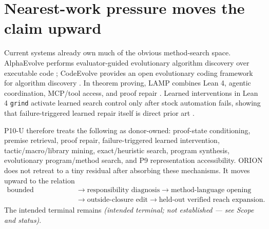 \section{Nearest-work pressure moves the claim upward}
Current systems already own much of the obvious method-search space. AlphaEvolve performs evaluator-guided evolutionary algorithm discovery over executable code \cite{alphaevolve2025}; CodeEvolve provides an open evolutionary coding framework for algorithm discovery \cite{codeevolve2025}. In theorem proving, LAMP combines Lean 4, agentic coordination, MCP/tool access, and proof repair \cite{lamp2026}. Learned interventions in Lean 4 \texttt{grind} activate learned search control only after stock automation fails, showing that failure-triggered learned repair itself is direct prior art \cite{grind2026}.

P10-U therefore treats the following as donor-owned: proof-state conditioning, premise retrieval, proof repair, failure-triggered learned intervention, tactic/macro/library mining, exact/heuristic search, program synthesis, evolutionary program/method search, and P9 representation accessibility. ORION does not retreat to a tiny residual after absorbing these mechanisms. It moves upward to the relation
\[
\begin{aligned}
\text{bounded obstruction}
  &\to\text{responsibility diagnosis}
  \to\text{method-language opening}\\
  &\to\text{outside-closure edit}
  \to\text{held-out verified reach expansion}.
\end{aligned}
\]
The intended terminal remains
\textbf{} \emph{(intended terminal; not established --- see Scope and status)}.
